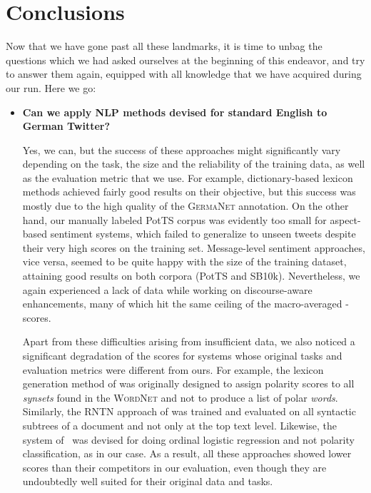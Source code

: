 \section*{Conclusions}

Now that we have gone past all these landmarks, it is time to unbag
the questions which we had asked ourselves at the beginning of this
endeavor, and try to answer them again, equipped with all knowledge
that we have acquired during our run.  Here we go:

\begin{itemize}
  \item\textbf{Can we apply NLP methods devised for standard English
    to German Twitter?}

    Yes, we can, but the success of these approaches might
    significantly vary depending on the task, the size and the
    reliability of the training data, as well as the evaluation metric
    that we use. For example, dictionary-based lexicon methods
    achieved fairly good results on their objective, but this success
    was mostly due to the high quality of the \textsc{GermaNet}
    annotation.  On the other hand, our manually labeled PotTS corpus
    was evidently too small for aspect-based sentiment systems, which
    failed to generalize to unseen tweets despite their very high
    scores on the training set.  Message-level sentiment approaches,
    vice versa, seemed to be quite happy with the size of the training
    dataset, attaining good results on both corpora (PotTS and SB10k).
    Nevertheless, we again experienced a lack of data while working on
    discourse-aware enhancements, many of which hit the same ceiling
    of the macro-averaged \F{}-scores.

    Apart from these difficulties arising from insufficient data, we
    also noticed a significant degradation of the scores for systems
    whose original tasks and evaluation metrics were different from
    ours.  For example, the lexicon generation method of
    \citet{Esuli:05} was originally designed to assign polarity scores
    to all \emph{synsets} found in the \textsc{WordNet} and not to
    produce a list of polar \emph{words}.  Similarly, the RNTN
    approach of \citet{Socher:13} was trained and evaluated on all
    syntactic subtrees of a document and not only at the top text
    level.  Likewise, the system of~\citet{Yessenalina:11} was devised
    for doing ordinal logistic regression and not polarity
    classification, as in our case.  As a result, all these approaches
    showed lower scores than their competitors in our evaluation, even
    though they are undoubtedly well suited for their original data
    and tasks.


\end{itemize}
